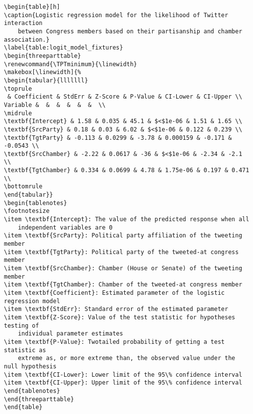 \documentclass[11pt]{article}
\begin{document}
\begin{Verbatim}[tabsize=4]
\begin{table}[h]
\caption{Logistic regression model for the likelihood of Twitter interaction
	between Congress members based on their partisanship and chamber association.}
\label{table:logit_model_fixtures}
\begin{threeparttable}
\renewcommand{\TPTminimum}{\linewidth}
\makebox[\linewidth]{%
\begin{tabular}{lllllll}
\toprule
 & Coefficient & StdErr & Z-Score & P-Value & CI-Lower & CI-Upper \\
Variable &  &  &  &  &  &  \\
\midrule
\textbf{Intercept} & 1.58 & 0.035 & 45.1 & $<$1e-06 & 1.51 & 1.65 \\
\textbf{SrcParty} & 0.18 & 0.03 & 6.02 & $<$1e-06 & 0.122 & 0.239 \\
\textbf{TgtParty} & -0.113 & 0.0299 & -3.78 & 0.000159 & -0.171 & -0.0543 \\
\textbf{SrcChamber} & -2.22 & 0.0617 & -36 & $<$1e-06 & -2.34 & -2.1 \\
\textbf{TgtChamber} & 0.334 & 0.0699 & 4.78 & 1.75e-06 & 0.197 & 0.471 \\
\bottomrule
\end{tabular}}
\begin{tablenotes}
\footnotesize
\item \textbf{Intercept}: The value of the predicted response when all
	independent variables are 0
\item \textbf{SrcParty}: Political party affiliation of the tweeting member
\item \textbf{TgtParty}: Political party of the tweeted-at congress member
\item \textbf{SrcChamber}: Chamber (House or Senate) of the tweeting member
\item \textbf{TgtChamber}: Chamber of the tweeted-at congress member
\item \textbf{Coefficient}: Estimated parameter of the logistic regression model
\item \textbf{StdErr}: Standard error of the estimated parameter
\item \textbf{Z-Score}: Value of the test statistic for hypotheses testing of
	individual parameter estimates
\item \textbf{P-Value}: Twotailed probability of getting a test statistic as
	extreme as, or more extreme than, the observed value under the null hypothesis
\item \textbf{CI-Lower}: Lower limit of the 95\% confidence interval
\item \textbf{CI-Upper}: Upper limit of the 95\% confidence interval
\end{tablenotes}
\end{threeparttable}
\end{table}

\end{Verbatim}
\end{document}
